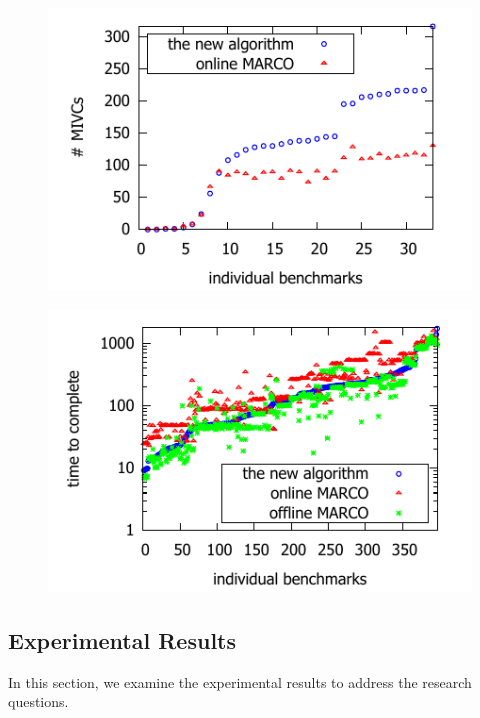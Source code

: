 \begin{figure}[!t]
\centering
\begin{minipage}{.48\textwidth}
\centering
\includegraphics[scale=0.8]{./plots/found_mivcs.pdf}%
%
\label{res:found_mivcs}
\end{minipage}\hfill
\begin{minipage}{.48\textwidth}
\centering
\includegraphics[scale=0.8]{./plots/time_to_complete.pdf}%
%
\label{res:time_to_complete}
\end{minipage}
\end{figure}



\subsection{Experimental Results}
In this section, we examine the experimental results to address the research questions.

